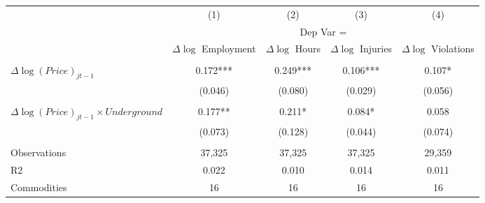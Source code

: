 \begin{tabular}{lcccc}
\hline
      & (1)   & (2)   & (3)   & (4) \bigstrut[t]\\
      & \multicolumn{4}{c}{Dep Var = } \bigstrut[b]\\
\cline{2-5}  	\addlinespace[2pt]    & \shortstack{$\Delta\log$ \\ Employment} & \shortstack{$\Delta\log$ \\ Hours} & \shortstack{$\Delta\log$ \\ Injuries} & \shortstack{$\Delta\log$ \\ Violations} \bigstrut\\
\hline
      &       &       &       &  \bigstrut[t]\\
$\Delta\log(Price)_{jt-1}$ & 0.172*** & 0.249*** & 0.106*** & 0.107* \\
      & (0.046) & (0.080) & (0.029) & (0.056) \\
      &       &       &       &  \\
$\Delta\log(Price)_{jt-1}\times Underground$ & 0.177** & 0.211* & 0.084* & 0.058 \\
      & (0.073) & (0.128) & (0.044) & (0.074) \\
      &       &       &       &  \\
Observations & 37,325 & 37,325 & 37,325 & 29,359 \\
R2    & 0.022 & 0.010 & 0.014 & 0.011 \\
Commodities & 16    & 16    & 16    & 16 \bigstrut[b]\\
\hline
\end{tabular}%